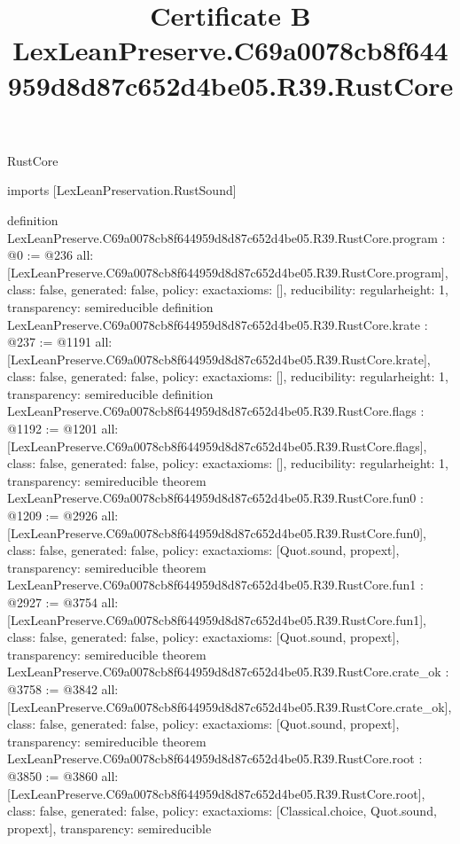 \begin{lexlean}{RustCore}
\title{Certificate B LexLeanPreserve.C69a0078cb8f644959d8d87c652d4be05.R39.RustCore}
\begin{coremodule}
imports [LexLeanPreservation.RustSound]

definition LexLeanPreserve.C69a0078cb8f644959d8d87c652d4be05.R39.RustCore.program : @0 := @236 {
  all: [LexLeanPreserve.C69a0078cb8f644959d8d87c652d4be05.R39.RustCore.program],
  class: false,
  generated: false,
  policy: exact{axioms: []},
  reducibility: regular{height: 1},
  transparency: semireducible
}
definition LexLeanPreserve.C69a0078cb8f644959d8d87c652d4be05.R39.RustCore.krate : @237 := @1191 {
  all: [LexLeanPreserve.C69a0078cb8f644959d8d87c652d4be05.R39.RustCore.krate],
  class: false,
  generated: false,
  policy: exact{axioms: []},
  reducibility: regular{height: 1},
  transparency: semireducible
}
definition LexLeanPreserve.C69a0078cb8f644959d8d87c652d4be05.R39.RustCore.flags : @1192 := @1201 {
  all: [LexLeanPreserve.C69a0078cb8f644959d8d87c652d4be05.R39.RustCore.flags],
  class: false,
  generated: false,
  policy: exact{axioms: []},
  reducibility: regular{height: 1},
  transparency: semireducible
}
theorem LexLeanPreserve.C69a0078cb8f644959d8d87c652d4be05.R39.RustCore.fun0 : @1209 := @2926 {
  all: [LexLeanPreserve.C69a0078cb8f644959d8d87c652d4be05.R39.RustCore.fun0],
  class: false,
  generated: false,
  policy: exact{axioms: [Quot.sound, propext]},
  transparency: semireducible
}
theorem LexLeanPreserve.C69a0078cb8f644959d8d87c652d4be05.R39.RustCore.fun1 : @2927 := @3754 {
  all: [LexLeanPreserve.C69a0078cb8f644959d8d87c652d4be05.R39.RustCore.fun1],
  class: false,
  generated: false,
  policy: exact{axioms: [Quot.sound, propext]},
  transparency: semireducible
}
theorem LexLeanPreserve.C69a0078cb8f644959d8d87c652d4be05.R39.RustCore.crate_ok : @3758 := @3842 {
  all: [LexLeanPreserve.C69a0078cb8f644959d8d87c652d4be05.R39.RustCore.crate_ok],
  class: false,
  generated: false,
  policy: exact{axioms: [Quot.sound, propext]},
  transparency: semireducible
}
theorem LexLeanPreserve.C69a0078cb8f644959d8d87c652d4be05.R39.RustCore.root : @3850 := @3860 {
  all: [LexLeanPreserve.C69a0078cb8f644959d8d87c652d4be05.R39.RustCore.root],
  class: false,
  generated: false,
  policy: exact{axioms: [Classical.choice, Quot.sound, propext]},
  transparency: semireducible
}


\end{coremodule}
\end{lexlean}
